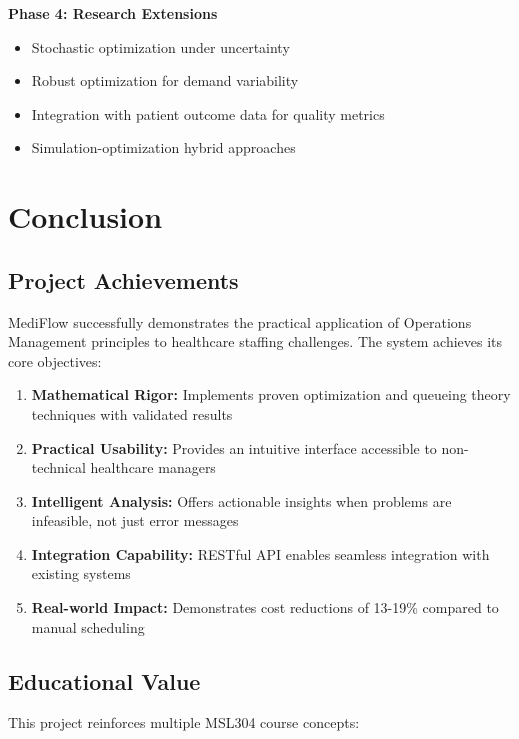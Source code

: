 \documentclass[12pt,a4paper]{article}
\begin{document}
\textbf{Phase 4: Research Extensions}
\begin{itemize}
    \item Stochastic optimization under uncertainty
    \item Robust optimization for demand variability
    \item Integration with patient outcome data for quality metrics
    \item Simulation-optimization hybrid approaches
\end{itemize}

\newpage

\section{Conclusion}
\label{sec:conclusion}

\subsection{Project Achievements}
\label{subsec:achievements}

MediFlow successfully demonstrates the practical application of Operations Management principles to healthcare staffing challenges. The system achieves its core objectives:

\begin{enumerate}
    \item \textbf{Mathematical Rigor:} Implements proven optimization and queueing theory techniques with validated results
    \item \textbf{Practical Usability:} Provides an intuitive interface accessible to non-technical healthcare managers
    \item \textbf{Intelligent Analysis:} Offers actionable insights when problems are infeasible, not just error messages
    \item \textbf{Integration Capability:} RESTful API enables seamless integration with existing systems
    \item \textbf{Real-world Impact:} Demonstrates cost reductions of 13-19\% compared to manual scheduling
\end{enumerate}

\subsection{Educational Value}

This project reinforces multiple MSL304 course concepts:
\end{document}
